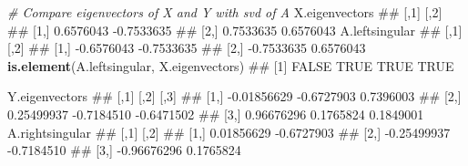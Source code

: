 \documentclass[]{article}
\newenvironment{Shaded}{\begin{snugshade}}{\end{snugshade}}
\newcommand{\KeywordTok}[1]{\textcolor[rgb]{0.13,0.29,0.53}{\textbf{#1}}}
\newcommand{\DataTypeTok}[1]{\textcolor[rgb]{0.13,0.29,0.53}{#1}}
\newcommand{\DecValTok}[1]{\textcolor[rgb]{0.00,0.00,0.81}{#1}}
\newcommand{\StringTok}[1]{\textcolor[rgb]{0.31,0.60,0.02}{#1}}
\newcommand{\CommentTok}[1]{\textcolor[rgb]{0.56,0.35,0.01}{\textit{#1}}}
\newcommand{\OperatorTok}[1]{\textcolor[rgb]{0.81,0.36,0.00}{\textbf{#1}}}
\newcommand{\NormalTok}[1]{#1}
\begin{document}
\begin{Shaded}
\end{Shaded}

\begin{Shaded}
\begin{Highlighting}[]
\CommentTok{# Compare eigenvectors of X and Y with svd of A}
\NormalTok{X.eigenvectors}
\NormalTok{##           [,1]       [,2]}
\NormalTok{## [1,] 0.6576043 -0.7533635}
\NormalTok{## [2,] 0.7533635  0.6576043}
\NormalTok{A.leftsingular}
\NormalTok{##            [,1]       [,2]}
\NormalTok{## [1,] -0.6576043 -0.7533635}
\NormalTok{## [2,] -0.7533635  0.6576043}
\KeywordTok{is.element}\NormalTok{(A.leftsingular, X.eigenvectors)}
\NormalTok{## [1] FALSE  TRUE  TRUE  TRUE}

\NormalTok{Y.eigenvectors}
\NormalTok{##             [,1]       [,2]       [,3]}
\NormalTok{## [1,] -0.01856629 -0.6727903  0.7396003}
\NormalTok{## [2,]  0.25499937 -0.7184510 -0.6471502}
\NormalTok{## [3,]  0.96676296  0.1765824  0.1849001}
\NormalTok{A.rightsingular}
\NormalTok{##             [,1]       [,2]}
\NormalTok{## [1,]  0.01856629 -0.6727903}
\NormalTok{## [2,] -0.25499937 -0.7184510}
\NormalTok{## [3,] -0.96676296  0.1765824}
\end{Highlighting}
\end{Shaded}
\end{document}
